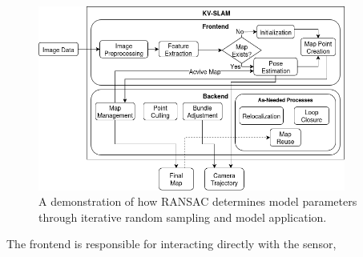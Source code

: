 \begin{figure}[!ht]
    \centering
    \includegraphics[width=0.9\textwidth]{resources/subprocesses.png}
    \caption[KV-SLAM Subprocesses]{A demonstration of how RANSAC determines model parameters through iterative random sampling and model application.}
    \label{fig:subprocesses}
\end{figure}

The frontend is responsible for interacting directly with the sensor, 